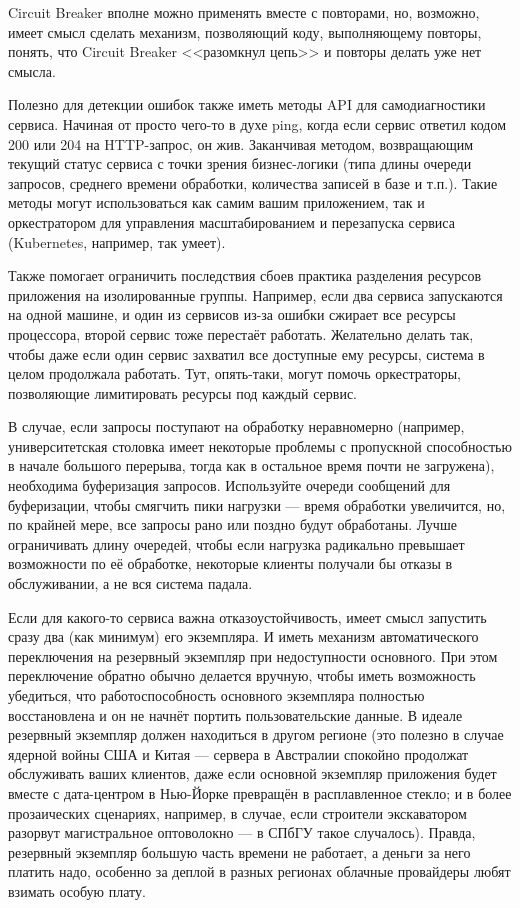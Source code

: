 \documentclass{../text-style}
\begin{document}
Circuit Breaker вполне можно применять вместе с повторами, но, возможно, имеет смысл сделать механизм, позволяющий коду, выполняющему повторы, понять, что Circuit Breaker <<разомкнул цепь>> и повторы делать уже нет смысла.

Полезно для детекции ошибок также иметь методы API для самодиагностики сервиса. Начиная от просто чего-то в духе ping, когда если сервис ответил кодом 200 или 204 на HTTP-запрос, он жив. Заканчивая методом, возвращающим текущий статус сервиса с точки зрения бизнес-логики (типа длины очереди запросов, среднего времени обработки, количества записей в базе и т.п.). Такие методы могут использоваться как самим вашим приложением, так и оркестратором для управления масштабированием и перезапуска сервиса (Kubernetes, например, так умеет).

Также помогает ограничить последствия сбоев практика разделения ресурсов приложения на изолированные группы. Например, если два сервиса запускаются на одной машине, и один из сервисов из-за ошибки сжирает все ресурсы процессора, второй сервис тоже перестаёт работать. Желательно делать так, чтобы даже если один сервис захватил все доступные ему ресурсы, система в целом продолжала работать. Тут, опять-таки, могут помочь оркестраторы, позволяющие лимитировать ресурсы под каждый сервис.

В случае, если запросы поступают на обработку неравномерно (например, университетская столовка имеет некоторые проблемы с пропускной способностью в начале большого перерыва, тогда как в остальное время почти не загружена), необходима буферизация запросов. Используйте очереди сообщений для буферизации, чтобы смягчить пики нагрузки --- время обработки увеличится, но, по крайней мере, все запросы рано или поздно будут обработаны. Лучше ограничивать длину очередей, чтобы если нагрузка радикально превышает возможности по её обработке, некоторые клиенты получали бы отказы в обслуживании, а не вся система падала.

Если для какого-то сервиса важна отказоустойчивость, имеет смысл запустить сразу два (как минимум) его экземпляра. И иметь механизм автоматического переключения на резервный экземпляр при недоступности основного. При этом переключение обратно обычно делается вручную, чтобы иметь возможность убедиться, что работоспособность основного экземпляра полностью восстановлена и он не начнёт портить пользовательские данные. В идеале резервный экземпляр должен находиться в другом регионе (это полезно в случае ядерной войны США и Китая --- сервера в Австралии спокойно продолжат обслуживать ваших клиентов, даже если основной экземпляр приложения будет вместе с дата-центром в Нью-Йорке превращён в расплавленное стекло; и в более прозаических сценариях, например, в случае, если строители экскаватором разорвут магистральное оптоволокно --- в СПбГУ такое случалось). Правда, резервный экземпляр большую часть времени не работает, а деньги за него платить надо, особенно за деплой в разных регионах облачные провайдеры любят взимать особую плату.
\end{document}
